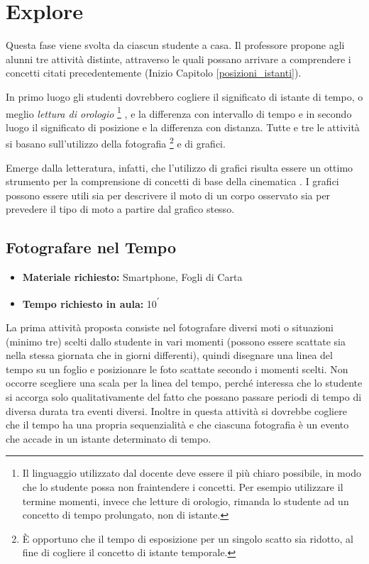 \documentclass{report} \usepackage[T1]{fontenc} \usepackage[italian]{babel}
\begin{document}
\section{Explore}
Questa fase viene svolta da ciascun studente a casa. Il professore propone agli
alunni tre attività distinte, attraverso le quali possano arrivare a
comprendere i concetti citati precedentemente (Inizio Capitolo \ref{posizioni_istanti}).

In primo luogo gli
studenti dovrebbero cogliere il significato di istante di tempo, o meglio
\emph{lettura di orologio}\cite{arons1997teaching}
\footnote{
           Il linguaggio utilizzato dal docente deve essere il più chiaro possibile, in modo
           che lo studente possa non fraintendere i concetti. Per esempio utilizzare il
           termine momenti, invece che letture di orologio, rimanda lo studente ad un
           concetto di tempo prolungato, non di istante.
         }
, e la differenza con intervallo
di tempo e in secondo luogo il significato di posizione e la differenza con distanza.
Tutte e tre le attività si basano sull’utilizzo della fotografia
\footnote{
          \`E opportuno che il tempo di esposizione per un singolo scatto sia ridotto, al
            fine di cogliere il concetto di istante temporale.
         }
e di grafici.

Emerge dalla letteratura, infatti, che l’utilizzo di grafici risulta essere un
ottimo strumento per la comprensione di concetti di base della cinematica
\cite{beichner1994testing}. I grafici possono essere
utili sia per descrivere il moto di un corpo osservato sia per prevedere il tipo
di moto a partire dal grafico stesso.

\subsection{Fotografare nel Tempo}

\begin{itemize}
\item \textbf{Materiale richiesto:} Smartphone, Fogli di Carta
\item \textbf{Tempo richiesto in aula:} 10\textsuperscript{$\prime$}
\end{itemize}

La prima attività proposta consiste nel fotografare diversi moti o situazioni
(minimo tre) scelti dallo studente in vari momenti (possono essere scattate sia
nella stessa giornata che in giorni differenti), quindi disegnare una linea del
tempo su un foglio e posizionare le foto scattate secondo i momenti scelti. Non
occorre scegliere una scala per la linea del tempo, perché interessa che lo
studente si accorga solo qualitativamente del fatto che possano passare periodi
di tempo di diversa durata tra eventi diversi. Inoltre in questa attività si
dovrebbe cogliere che il tempo ha una propria sequenzialità e che ciascuna
fotografia è un evento che accade in un istante determinato di tempo.
\end{document}
